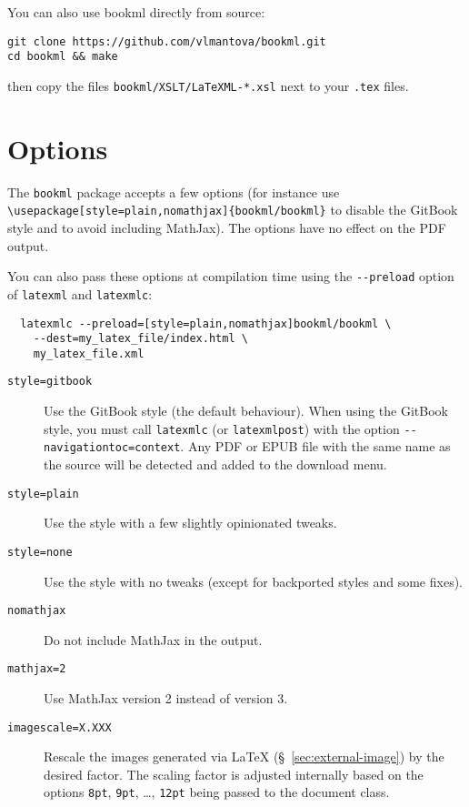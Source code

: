 \documentclass[a4paper,british]{article}
\def\ltxinline{\lstinline[style=bookml]}
\begin{document}
You can also use bookml directly from source:
\begin{lstlisting}
git clone https://github.com/vlmantova/bookml.git
cd bookml && make
\end{lstlisting}
then copy the files \lstinline|bookml/XSLT/LaTeXML-*.xsl| next to your \lstinline|.tex| files.

\section{Options}

The \ltxinline|bookml| package accepts a few options (for instance use \ltxinline|\usepackage[style=plain,nomathjax]{bookml/bookml}| to disable the GitBook style and to avoid including MathJax). The options have no effect on the PDF output.

You can also pass these options at compilation time using the \ltxinline|--preload| option of \ltxinline|latexml| and \ltxinline|latexmlc|:
\begin{lstlisting}
  latexmlc --preload=[style=plain,nomathjax]bookml/bookml \
    --dest=my_latex_file/index.html \
    my_latex_file.xml
\end{lstlisting}

\begin{description}
  \item[\texttt{style=gitbook}] Use the GitBook style (the default behaviour). When using the GitBook style, you must call \ltxinline|latexmlc| (or \ltxinline|latexmlpost|) with the option \ltxinline|--navigationtoc=context|. Any PDF or EPUB file with the same name as the source will be detected and added to the download menu.
  \item[\texttt{style=plain}] Use the \LaTeXML{} style with a few slightly opinionated tweaks.
  \item[\texttt{style=none}] Use the \LaTeXML{} style with no tweaks (except for backported styles and some fixes).
  \item[\texttt{nomathjax}] Do not include MathJax in the output.
  \item[\texttt{mathjax=2}] Use MathJax version 2 instead of version 3.
  \item[\texttt{imagescale=X.XXX}] Rescale the images generated via \LaTeX{} (\S~\ref{sec:external-image}) by the desired factor. The scaling factor is adjusted internally based on the options \ltxinline|8pt|, \ltxinline|9pt|, \dots, \ltxinline|12pt| being passed to the document class.
\end{description}
\end{document}
